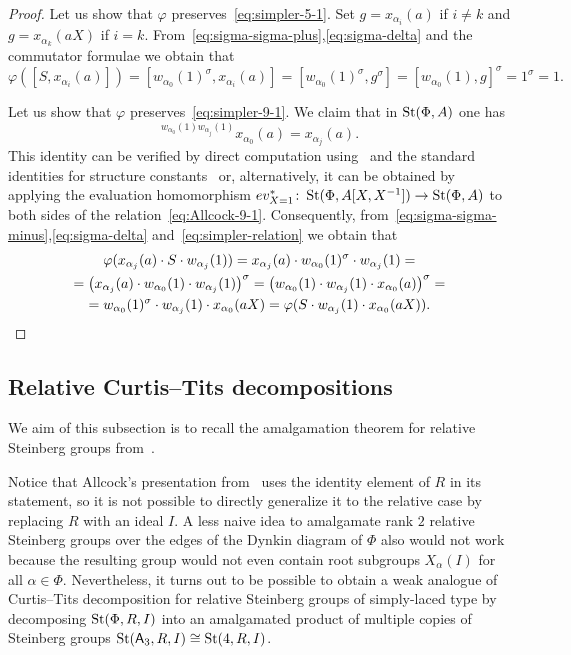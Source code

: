 \begin{proof}
 Let us show that $\varphi$ preserves~\eqref{eq:simpler-5-1}.
 Set $g = x_{\alpha_i}(a)$ if $i \neq k$ and $g = x_{\alpha_k}(aX)$ if $i = k$.
 From~\eqref{eq:sigma-sigma-plus},\eqref{eq:sigma-delta} and the commutator formulae we obtain that
 \begin{equation*}
     \varphi([S, x_{\alpha_i}(a)]) = [w_{\alpha_0}(1)^\sigma, x_{\alpha_i}(a)] = [w_{\alpha_0}(1)^\sigma, g^\sigma] = [w_{\alpha_0}(1), g]^\sigma = 1^\sigma = 1.
 \end{equation*}

 Let us show that $\varphi$ preserves~\eqref{eq:simpler-9-1}.
 We claim that in $\operatorname{St}(\Phi, A)$ one has
 \begin{equation} \label{eq:simpler-relation} {}^{w_{\alpha_0}(1) w_{\alpha_j}(1)} x_{\alpha_0}(a) = x_{\alpha_j}(a). \end{equation}
 This identity can be verified by direct computation using~\cite[Lemma~5.1]{Ma69} and the standard identities for structure constants~\cite[\S~14]{VP} or,
 alternatively, it can be obtained by applying the evaluation homomorphism
  $ev_{X=1}^*\colon \operatorname{St}(\Phi, A[X, X^{-1}]) \to \operatorname{St}(\Phi, A)$ to both sides of the relation~\eqref{eq:Allcock-9-1}.
 Consequently, from~\eqref{eq:sigma-sigma-minus},\eqref{eq:sigma-delta} and~\eqref{eq:simpler-relation} we obtain that
 \begin{multline*}
     \varphi(x_{\alpha_j}(a) \cdot S \cdot w_{\alpha_j}(1)) = x_{\alpha_j}(a) \cdot w_{\alpha_0}(1)^\sigma \cdot w_{\alpha_j}(1) = \\
     = \left(x_{\alpha_j}(a) \cdot w_{\alpha_0}(1) \cdot w_{\alpha_j}(1)\right)^\sigma = \left(w_{\alpha_0}(1) \cdot w_{\alpha_j}(1) \cdot x_{\alpha_0}(a)\right)^\sigma = \\
     = w_{\alpha_0}(1)^\sigma \cdot w_{\alpha_j}(1) \cdot x_{\alpha_0}(aX) = \varphi(S \cdot w_{\alpha_j}(1) \cdot x_{\alpha_0}(aX)). \qedhere
 \end{multline*}
\end{proof}

\subsection{Relative Curtis--Tits decompositions}
We aim of this subsection is to recall the amalgamation theorem for relative Steinberg groups from~\cite{S15}.

Notice that Allcock's presentation from~\cite{A16, A13} uses the identity element of $R$ in its statement,
 so it is not possible to directly generalize it to the relative case by replacing $R$ with an ideal $I$.
A less naive idea to amalgamate rank $2$ relative Steinberg groups over the edges of the Dynkin diagram of $\Phi$ also would not work
 because the resulting group would not even contain root subgroups $X_\alpha(I)$ for all $\alpha \in \Phi$.
Nevertheless, it turns out to be possible to obtain a weak analogue of Curtis--Tits decomposition for relative Steinberg groups of simply-laced type
 by decomposing $\operatorname{St}(\Phi, R, I)$ into an amalgamated product of multiple copies of Steinberg groups $\operatorname{St}(\mathsf{A}_3, R, I) \cong \operatorname{St}(4, R, I)$.

